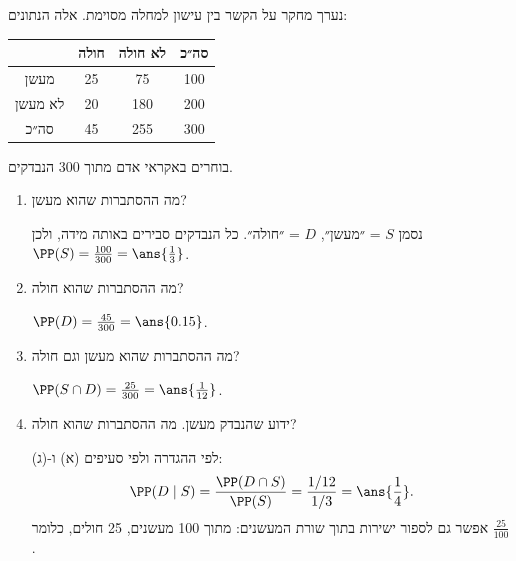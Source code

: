 נערך מחקר על הקשר בין עישון למחלה מסוימת. אלה הנתונים:
\begin{center}
\begin{tabular}{c|cc|c}
& חולה & לא חולה & סה״כ\\ \hline
מעשן & 25 & 75 & 100\\
לא מעשן & 20 & 180 & 200\\ \hline
סה״כ & 45 & 255 & 300
\end{tabular}
\end{center}
בוחרים באקראי אדם מתוך 300 הנבדקים.
\begin{enumerate}
\item מה ההסתברות שהוא מעשן?
\begin{solbox}
נסמן $S$ = ״מעשן״, $D$ = ״חולה״. כל הנבדקים סבירים באותה מידה, ולכן $\PP(S)=\frac{100}{300}=\ans{\frac13}$.
\end{solbox}
\item מה ההסתברות שהוא חולה?
\begin{solbox}
$\PP(D)=\frac{45}{300}=\ans{0.15}$.
\end{solbox}
\item מה ההסתברות שהוא מעשן וגם חולה?
\begin{solbox}
$\PP(S\cap D)=\frac{25}{300}=\ans{\frac1{12}}$.
\end{solbox}
\item ידוע שהנבדק מעשן. מה ההסתברות שהוא חולה?
\begin{solbox}
לפי ההגדרה ולפי סעיפים (א) ו-(ג):
\[
\PP(D\mid S)=\frac{\PP(D\cap S)}{\PP(S)}=\frac{1/12}{1/3}=\ans{\frac14}.
\]
אפשר גם לספור ישירות בתוך שורת המעשנים: מתוך 100 מעשנים, 25 חולים, כלומר $\frac{25}{100}$.
\end{solbox}
\end{enumerate}

